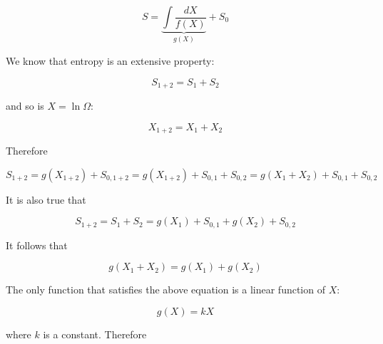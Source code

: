 \documentclass[12pt,a4paper]{report}
\newcommand{\esp}{\vspace{0.5cm}}
\begin{document}
	\esp
	
	\begin{equation}
		S = \underbrace{\int \frac{dX}{f(X)}}_{g(X)} + S_0
	\end{equation}
	
	\esp
	
	\noindent We know that entropy is an extensive property:
	
	\esp
	
	\begin{equation}
		S_{1+2} = S_1 + S_2
	\end{equation}
	
	\esp
	
	\noindent and so is $X = \ln \Omega$:
	
	\esp
	
	\begin{equation}
		X_{1+2} = X_1 + X_2
	\end{equation}
	
	\esp
	
	\noindent Therefore
	
	\esp
	
	\begin{equation}
		S_{1+2} = g(X_{1+2}) + S_{0,1+2} = g(X_{1+2}) + S_{0,1} + S_{0,2} = g(X_1 + X_2) + S_{0,1} + S_{0,2}
	\end{equation}
	
	\esp
	
	\noindent It is also true that
	
	\esp
	
	\begin{equation}
		S_{1+2} = S_1 + S_2 = g(X_1) + S_{0,1} + g(X_2) + S_{0,2}
	\end{equation}
	
	\esp
	
	\noindent It follows that
	
	\esp
	
	\begin{equation}
		g(X_1 + X_2) = g(X_1) + g(X_2)
	\end{equation}
	
	\esp
	
	\noindent The only function that satisfies the above equation is a linear function of $X$:
	
	\esp
	
	\begin{equation}
		g(X) = kX
	\end{equation}
	
	\esp
	
	\noindent where $k$ is a constant. Therefore
	
\end{document}
